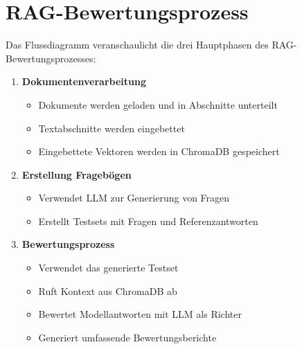 \section{RAG-Bewertungsprozess}

Das Flussdiagramm veranschaulicht die drei Hauptphasen des RAG-Bewertungsprozesses:

\begin{enumerate}
    \item \textbf{Dokumentenverarbeitung}
    \begin{itemize}
        \item Dokumente werden geladen und in Abschnitte unterteilt
        \item Textabschnitte werden eingebettet
        \item Eingebettete Vektoren werden in ChromaDB gespeichert
    \end{itemize}
    
    \item \textbf{Erstellung Fragebögen}
    \begin{itemize}
        \item Verwendet LLM zur Generierung von Fragen
        \item Erstellt Testsets mit Fragen und Referenzantworten
    \end{itemize}
    
    \item \textbf{Bewertungsprozess}
    \begin{itemize}
        \item Verwendet das generierte Testset
        \item Ruft Kontext aus ChromaDB ab
        \item Bewertet Modellantworten mit LLM als Richter
        \item Generiert umfassende Bewertungsberichte
    \end{itemize}
\end{enumerate}


